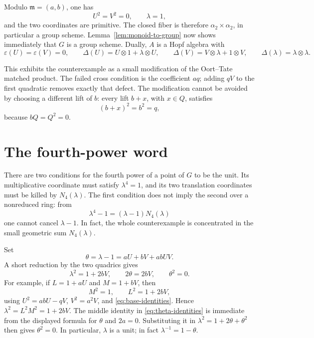 \documentclass[11pt]{amsart}
\theoremstyle{remark}
\newcommand{\eps}{\varepsilon}
\newcommand{\ot}{\otimes}
\begin{document}
Modulo \(\mathfrak m=(a,b)\), one has
\[
 U^2=V^2=0,
 \qquad
 \lambda=1,
\]
and the two coordinates are primitive.  The closed fiber is therefore
\(\alpha_2\times\alpha_2\), in particular a group scheme.
Lemma~\ref{lem:monoid-to-group} now shows immediately that \(G\) is a
group scheme.  Dually, \(A\) is a Hopf algebra with
\[
 \eps(U)=\eps(V)=0,\qquad
 \Delta(U)=U\ot1+\lambda\ot U,
 \qquad
 \Delta(V)=V\ot\lambda+1\ot V,
 \qquad
 \Delta(\lambda)=\lambda\ot\lambda.
\]

This exhibits the counterexample as a small modification of the
Oort--Tate matched product.  The failed cross condition is the
coefficient \(aq\); adding \(qV\) to the first quadratic removes exactly
that defect.  The modification cannot be avoided by choosing a different
lift of \(b\): every lift \(b+x\), with \(x\in Q\), satisfies
\[
 (b+x)^2=b^2=q,
\]
because \(bQ=Q^2=0\).

\section{The fourth-power word}
\label{sec:power}

There are two conditions for the fourth power of a point of \(G\) to be
the unit.  Its multiplicative coordinate must satisfy
\(\lambda^4=1\), and its two translation coordinates must be killed by
\(N_4(\lambda)\).  The first condition does not imply the second over a
nonreduced ring: from
\[
 \lambda^4-1=(\lambda-1)N_4(\lambda)
\]
one cannot cancel \(\lambda-1\).  In fact, the whole counterexample is
concentrated in the small geometric sum \(N_4(\lambda)\).

Set
\[
 \theta=\lambda-1=aU+bV+abUV.
\]
A short reduction by the two quadrics gives
\begin{equation}\label{eq:theta-identities}
 \lambda^2=1+2bV,\qquad
 2\theta=2bV,\qquad
 \theta^2=0.
\end{equation}
For example, if \(L=1+aU\) and \(M=1+bV\), then
\[
 M^2=1,\qquad
 L^2=1+2bV,
\]
using \(U^2=abU-qV\), \(V^2=a^2V\), and
\eqref{eq:base-identities}.  Hence \(\lambda^2=L^2M^2=1+2bV\).
The middle identity in \eqref{eq:theta-identities} is immediate from
the displayed formula for \(\theta\) and \(2a=0\).  Substituting it in
\(\lambda^2=1+2\theta+\theta^2\) then gives \(\theta^2=0\).  In
particular, \(\lambda\) is a unit;
in fact \(\lambda^{-1}=1-\theta\).
\end{document}
